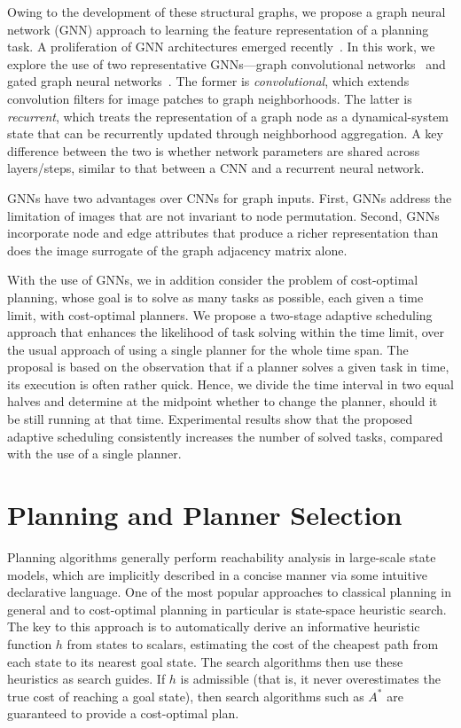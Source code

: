 \documentclass[letterpaper]{article} %
\newcommand{\astar}{\ensuremath{\mathit{A}^{\ast}}}
\begin{document}
Owing to the development of these structural graphs, we propose a
graph neural network (GNN) approach to learning the feature
representation of a planning task. A proliferation of GNN
architectures emerged
recently~\cite{Bruna2014,Defferrard2016,Li2016,Kipf2017,Hamilton2017,Gilmer2017,Velickovic2018}.
In this work, we explore the use of two representative GNNs---graph
convolutional networks~\cite{Kipf2017} and gated graph neural
networks~\cite{Li2016}. The former is \emph{convolutional}, which
extends convolution filters for image patches to graph
neighborhoods. The latter is \emph{recurrent}, which treats the
representation of a graph node as a dynamical-system state that can be
recurrently updated through neighborhood aggregation. A key difference
between the two is whether network parameters are shared across
layers/steps, similar to that between a CNN and a recurrent neural
network.

GNNs have two advantages over CNNs for graph inputs. First, GNNs
address the limitation of images that are not invariant to node
permutation. Second, GNNs incorporate node and edge attributes that
produce a richer representation than does the image surrogate of the
graph adjacency matrix alone.

With the use of GNNs, we in addition consider the problem of
cost-optimal planning, whose goal is to solve as many tasks as
possible, each given a time limit, with cost-optimal planners. We
propose a two-stage adaptive scheduling approach that enhances the
likelihood of task solving within the time limit, over the usual
approach of using a single planner for the whole time span. The
proposal is based on the observation that if a planner solves a given
task in time, its execution is often rather quick. Hence, we divide
the time interval in two equal halves and determine at the midpoint
whether to change the planner, should it be still running at that
time. Experimental results show that the proposed adaptive scheduling
consistently increases the number of solved tasks, compared with the
use of a single planner.


\section{Planning and Planner Selection}
Planning algorithms generally perform reachability analysis in
large-scale state models, which are implicitly described in a concise
manner via some intuitive declarative
language.
One of the
most popular approaches to classical planning in general and to
cost-optimal planning in particular is state-space heuristic
search. The key to this approach is to automatically derive an
informative heuristic function $h$ from states to scalars, estimating
the cost of the cheapest path from each state to its nearest goal
state. The search algorithms then use these heuristics as search
guides. If $h$ is admissible (that is, it never overestimates the true
cost of reaching a goal state), then search algorithms such as
$\astar$
are guaranteed to provide a
cost-optimal plan.
\end{document}
